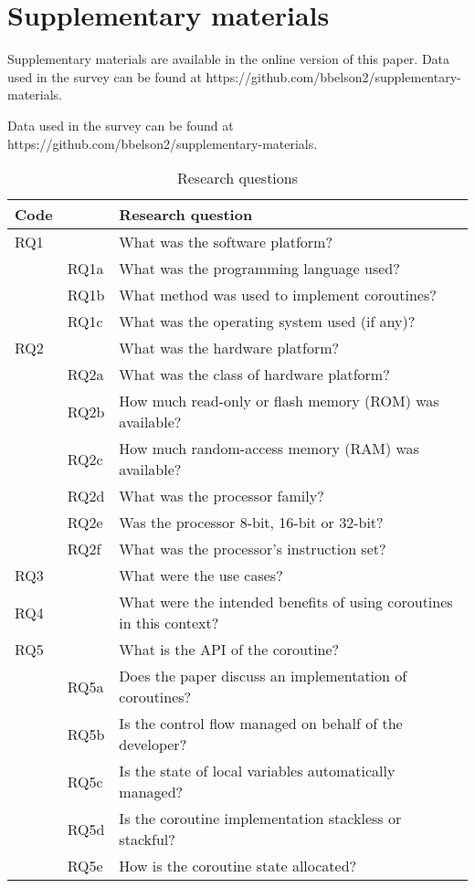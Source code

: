 \appendix

\section{Supplementary materials}


\begin{printonly}
	Supplementary materials are available in the online version of this paper. Data used in the survey can be found at https://github.com/bbelson2/supplementary-materials.
	
\end{printonly}

\begin{screenonly}
Data used in the survey can be found at https://github.com/bbelson2/supplementary-materials.


\begin{table}[h]
	\caption{Research questions}
	
	\begin{tabular}{l l l}
\hline
Code & & Research question \\
\hline
RQ1	& & What was the software platform?\\
& RQ1a & What was the programming language used?\\
& RQ1b & What method was used to implement coroutines?\\
& RQ1c & What was the operating system used (if any)?\\
RQ2	& & What was the hardware platform?\\
& RQ2a & What was the class of hardware platform?\\
& RQ2b & How much read-only or flash memory (ROM) was available?\\
& RQ2c & How much random-access memory (RAM) was available?\\
& RQ2d & What was the processor family?\\
& RQ2e & Was the processor 8-bit, 16-bit or 32-bit?\\
& RQ2f & What was the processor’s instruction set?\\
RQ3	 &  & What were the use cases?\\
RQ4	 &  & What were the intended benefits of using coroutines in this context?\\
RQ5	 &  & What is the API of the coroutine?\\
& RQ5a & Does the paper discuss an implementation of coroutines?\\
& RQ5b & Is the control flow managed on behalf of the developer?\\
& RQ5c & Is the state of local variables automatically managed?\\
& RQ5d & Is the coroutine implementation stackless or stackful?\\
& RQ5e & How is the coroutine state allocated?\\
\hline
	\end{tabular}
\end{table}
	

\end{screenonly}
